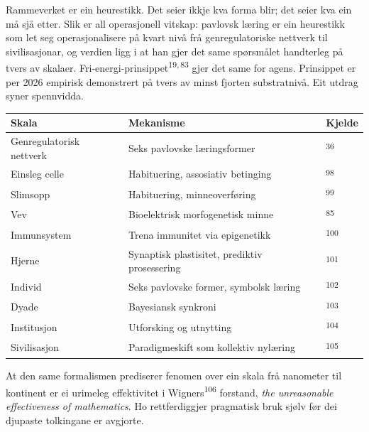 \begin{widebody}
{\small

Rammeverket er ein heurestikk. Det seier ikkje kva forma blir; det seier kva ein må sjå etter. Slik er all operasjonell vitskap: pavlovsk læring er ein heurestikk som let seg operasjonalisere på kvart nivå frå genregulatoriske nettverk til sivilisasjonar, og verdien ligg i at han gjer det same spørsmålet handterleg på tvers av skalaer. Fri-energi-prinsippet\textsuperscript{19,\,83} gjer det same for agens. Prinsippet er per 2026 empirisk demonstrert på tvers av minst fjorten substratnivå. Eit utdrag syner spennvidda.

\bigskip
\begin{center}
\footnotesize
\renewcommand{\arraystretch}{1.2}
\begin{tabular}{@{}p{38mm}p{50mm}l@{}}
\toprule
\textbf{Skala} & \textbf{Mekanisme} & \textbf{Kjelde} \\
\midrule
Genregulatorisk nettverk & Seks pavlovske læringsformer & \textsuperscript{36} \\
Einsleg celle & Habituering, assosiativ betinging & \textsuperscript{98} \\
Slimsopp & Habituering, minneoverføring & \textsuperscript{99} \\
Vev & Bioelektrisk morfogenetisk minne & \textsuperscript{85} \\
Immunsystem & Trena immunitet via epigenetikk & \textsuperscript{100} \\
Hjerne & Synaptisk plastisitet, prediktiv prosessering & \textsuperscript{101} \\
Individ & Seks pavlovske former, symbolsk læring & \textsuperscript{102} \\
Dyade & Bayesiansk synkroni & \textsuperscript{103} \\
Institusjon & Utforsking og utnytting & \textsuperscript{104} \\
Sivilisasjon & Paradigmeskift som kollektiv nylæring & \textsuperscript{105} \\
\bottomrule
\end{tabular}
\end{center}
\bigskip

At den same formalismen prediserer fenomen over ein skala frå nanometer til kontinent er ei urimeleg effektivitet i Wigners\textsuperscript{106} forstand, \textit{the unreasonable effectiveness of mathematics}. Ho rettferdiggjer pragmatisk bruk sjølv før dei djupaste tolkingane er avgjorte.

}
\end{widebody}
